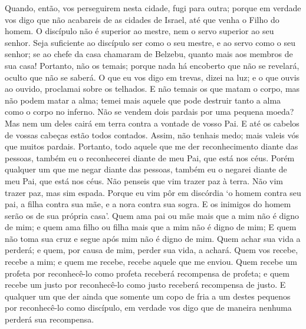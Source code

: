 {  Quando, então, vos perseguirem nesta cidade, fugi para outra; porque em verdade vos digo que não acabareis de
{} as cidades de Israel, até que venha o Filho do homem.
  O discípulo não é superior ao mestre, nem o servo superior ao seu senhor.
  Seja suficiente ao discípulo ser como o seu mestre, e ao servo como o seu senhor; se ao chefe da casa chamaram de Belzebu, quanto mais aos membros de sua casa!
  Portanto, não os temais; porque nada há encoberto que não se revelará,
{} oculto que não se saberá.
  O que eu vos digo em trevas, dizei na luz; e o que ouvis ao ouvido, proclamai sobre os telhados.
  E não temais os que matam o corpo, mas não podem matar a alma; temei mais aquele que pode destruir tanto a alma como o corpo no inferno.
  Não se vendem dois pardais por uma pequena moeda? Mas nem um deles cairá em terra contra a vontade de
 vosso Pai.
  E até os cabelos de vossas cabeças estão todos contados.
  Assim, não tenhais medo; mais valeis vós que muitos pardais.
  Portanto, todo aquele que me der reconhecimento diante das pessoas, também eu o reconhecerei diante de meu Pai, que está nos céus.
  Porém qualquer um que me negar diante das pessoas, também eu o negarei diante de meu Pai, que está nos céus.
  Não penseis que vim trazer paz à terra. Não vim trazer paz, mas sim espada.
  Porque eu vim pôr em discórdia ‘o homem contra seu pai, a filha contra sua mãe, e a nora contra sua sogra.
  E os inimigos do homem serão os de sua própria casa’.
{}
  Quem ama pai ou mãe mais que a mim não é digno de mim; e quem ama filho ou filha mais que a mim não é digno de mim;
  E quem não toma sua cruz e segue após mim não é digno de mim.
  Quem achar sua vida a perderá; e quem, por causa de mim, perder sua vida, a achará.
  Quem vos recebe, recebe a mim; e quem me recebe, recebe aquele que me enviou.
  Quem recebe um profeta por reconhecê-lo como
 profeta receberá recompensa de profeta; e quem recebe um justo por reconhecê-lo como justo receberá recompensa de justo.
  E qualquer um que der ainda que somente um copo de
{} fria a um destes pequenos por reconhecê-lo como discípulo, em verdade vos digo que de maneira nenhuma perderá sua recompensa.
\par }

